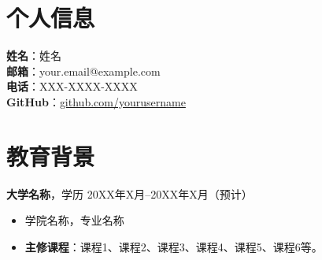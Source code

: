 \documentclass[11pt]{article}
\newlength{\iconwidth}
\begin{document}
    \begin{minipage}[t]{0.78\textwidth}
        \section[个人信息]{\makebox[\iconwidth][c]{\color{primary_color}{\faAddressCard}}\quad 个人信息}
        \begin{minipage}[t]{\textwidth}
            \textbf{姓\quad 名}：姓名 \\
            \textbf{邮\quad 箱}：your.email@example.com \\
            \textbf{电\quad 话}：XXX-XXXX-XXXX \\
            \textbf{GitHub}：\href{https://github.com/yourusername}{github.com/yourusername} \\
        \end{minipage}

        \begin{minipage}[t]{\textwidth}
        \section[教育背景]{\makebox[\iconwidth][c]{\color{primary_color}{\faGraduationCap}}\quad 教育背景}
        
        {\large \textbf{大学名称}}，学历 \hfill 20XX年X月--20XX年X月（预计）  
        \begin{itemize}
            \item 学院名称，专业名称
            \item \textbf{主修课程}：课程1、课程2、课程3、课程4、课程5、课程6等。
        \end{itemize}
        
        \vspace{1.2em}
        \end{minipage}
    \end{minipage}
    \hfill
\end{document}
